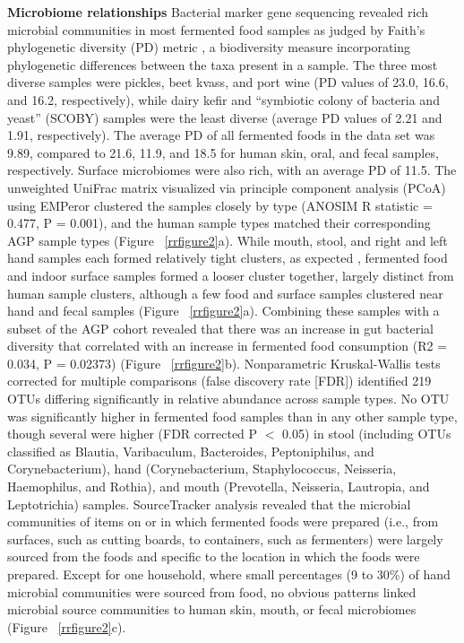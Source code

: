 \textbf{Microbiome relationships} Bacterial marker gene sequencing revealed rich
microbial communities in most fermented food samples as judged by Faith’s
phylogenetic diversity (PD) metric \cite{Faith1992}, a biodiversity measure
incorporating phylogenetic differences between the taxa present in a sample.
The three most diverse samples were pickles, beet kvass, and port wine
(PD values of 23.0, 16.6, and 16.2, respectively), while dairy kefir and
“symbiotic colony of bacteria and yeast” (SCOBY) samples were the least diverse
(average PD values of 2.21 and 1.91, respectively). The average PD of all
fermented foods in the data set was 9.89, compared to 21.6, 11.9, and 18.5 for
human skin, oral, and fecal samples, respectively. Surface microbiomes were also
rich, with an average PD of 11.5. The unweighted UniFrac matrix \cite{Lozupone2005}
visualized via principle component analysis (PCoA) using EMPeror clustered the samples
closely by type (ANOSIM R statistic = 0.477, P = 0.001), and the human sample types
matched their corresponding AGP sample types (Figure ~\ref{rrfigure2}a). While mouth,
stool, and right and left hand samples each formed relatively tight clusters, as
expected \cite{Consortium2012}, fermented food and indoor surface samples formed a
looser cluster together, largely distinct from human sample clusters, although a
few food and surface samples clustered near hand and fecal samples
(Figure ~\ref{rrfigure2}a). Combining these samples with a subset of the AGP cohort
revealed that there was an increase in gut bacterial diversity that correlated
with an increase in fermented food consumption (R2 = 0.034, P = 0.02373)
(Figure ~\ref{rrfigure2}b). Nonparametric Kruskal-Wallis tests corrected for
multiple comparisons (false discovery rate [FDR]) identified 219 OTUs differing
significantly in relative abundance across sample types. No OTU was significantly
higher in fermented food samples than in any other sample type, though several were
higher (FDR corrected P $<$ 0.05) in stool (including OTUs classified as Blautia,
Varibaculum, Bacteroides, Peptoniphilus, and Corynebacterium), hand (Corynebacterium,
Staphylococcus, Neisseria, Haemophilus, and Rothia), and mouth (Prevotella, Neisseria,
Lautropia, and Leptotrichia) samples. SourceTracker \cite{Knights2011} analysis revealed
that the microbial communities of items on or in which fermented foods were prepared
(i.e., from surfaces, such as cutting boards, to containers, such as fermenters)
were largely sourced from the foods and specific to the location in which the foods
were prepared. Except for one household, where small percentages (9 to 30\%) of
hand microbial communities were sourced from food, no obvious patterns linked
microbial source communities to human skin, mouth, or fecal microbiomes (Figure ~\ref{rrfigure2}c).

